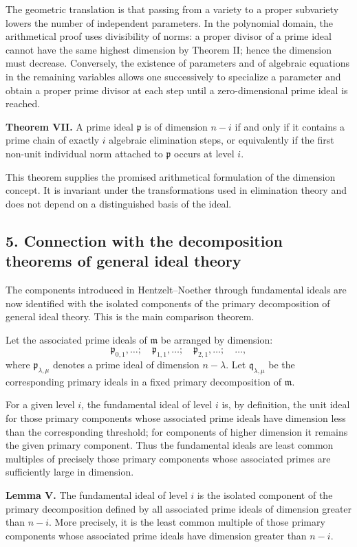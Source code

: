 \documentclass[11pt]{article}
\begin{document}
The geometric translation is that passing from a variety to a proper subvariety lowers the number of independent parameters. In the polynomial domain, the arithmetical proof uses divisibility of norms: a proper divisor of a prime ideal cannot have the same highest dimension by Theorem II; hence the dimension must decrease. Conversely, the existence of parameters and of algebraic equations in the remaining variables allows one successively to specialize a parameter and obtain a proper prime divisor at each step until a zero-dimensional prime ideal is reached.

\textbf{Theorem VII.} A prime ideal $\mathfrak p$ is of dimension $n-i$ if and only if it contains a prime chain of exactly $i$ algebraic elimination steps, or equivalently if the first non-unit individual norm attached to $\mathfrak p$ occurs at level $i$.

This theorem supplies the promised arithmetical formulation of the dimension concept. It is invariant under the transformations used in elimination theory and does not depend on a distinguished basis of the ideal.

\subsection{5. Connection with the decomposition theorems of general ideal theory}

The components introduced in Hentzelt--Noether through fundamental ideals are now identified with the isolated components of the primary decomposition of general ideal theory. This is the main comparison theorem.

Let the associated prime ideals of $\mathfrak m$ be arranged by dimension:
\[
  \mathfrak p_{0,1},\ldots;\quad \mathfrak p_{1,1},\ldots;\quad \mathfrak p_{2,1},\ldots;\quad\ldots,
\]
where $\mathfrak p_{\lambda,\mu}$ denotes a prime ideal of dimension $n-\lambda$. Let $\mathfrak q_{\lambda,\mu}$ be the corresponding primary ideals in a fixed primary decomposition of $\mathfrak m$.

For a given level $i$, the fundamental ideal of level $i$ is, by definition, the unit ideal for those primary components whose associated prime ideals have dimension less than the corresponding threshold; for components of higher dimension it remains the given primary component. Thus the fundamental ideals are least common multiples of precisely those primary components whose associated primes are sufficiently large in dimension.

\textbf{Lemma V.} The fundamental ideal of level $i$ is the isolated component of the primary decomposition defined by all associated prime ideals of dimension greater than $n-i$. More precisely, it is the least common multiple of those primary components whose associated prime ideals have dimension greater than $n-i$.
\end{document}
